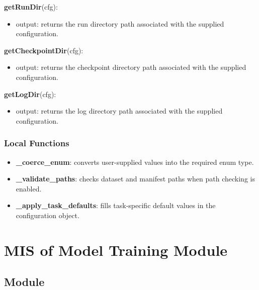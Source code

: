 \documentclass[12pt, titlepage]{article}
\begin{document}
\noindent \textbf{getRunDir}(cfg):
\begin{itemize}
    \item output: returns the run directory path associated with the supplied configuration.
\end{itemize}

\noindent \textbf{getCheckpointDir}(cfg):
\begin{itemize}
    \item output: returns the checkpoint directory path associated with the supplied configuration.
\end{itemize}

\noindent \textbf{getLogDir}(cfg):
\begin{itemize}
    \item output: returns the log directory path associated with the supplied configuration.
\end{itemize}

\subsubsection{Local Functions}

\begin{itemize}
    \item \textbf{\_coerce\_enum}: converts user-supplied values into the required enum type.
    \item \textbf{\_validate\_paths}: checks dataset and manifest paths when path checking is enabled.
    \item \textbf{\_apply\_task\_defaults}: fills task-specific default values in the configuration object.
\end{itemize}
















\newpage




\section{MIS of Model Training Module} \label{Module_ModelTraining}

\subsection{Module}
\end{document}
